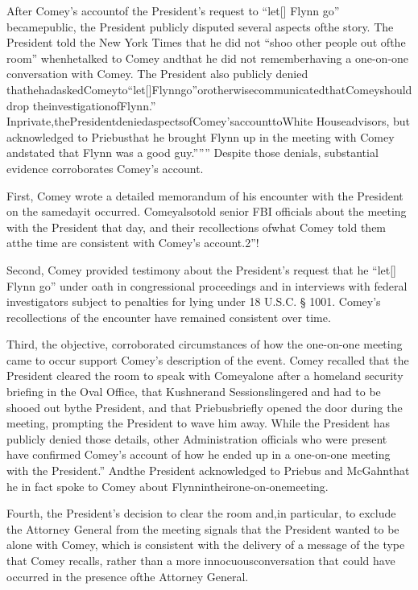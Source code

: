 After Comey’s accountof the President’s request to “let[] Flynn go” becamepublic, the President publicly disputed several aspects ofthe story.
The President told the New York Times that he did not “shoo other people out ofthe room” whenhetalked to Comey andthat he did not rememberhaving a one-on-one conversation with Comey.
The President also publicly denied thathehadaskedComeyto“let[]Flynngo”orotherwisecommunicatedthatComeyshoulddrop theinvestigationofFlynn.”
Inprivate,thePresidentdeniedaspectsofComey’saccounttoWhite Houseadvisors, but acknowledged to Priebusthat he brought Flynn up in the meeting with Comey andstated that Flynn was a good guy.”””
Despite those denials, substantial evidence corroborates Comey’s account.

First, Comey wrote a detailed memorandum of his encounter with the President on the samedayit occurred.
Comeyalsotold senior FBI officials about the meeting with the President that day, and their recollections ofwhat Comey told them atthe time are consistent with Comey’s account.2”!

Second, Comey provided testimony about the President’s request that he “let[] Flynn go” under oath in congressional proceedings and in interviews with federal investigators subject to penalties for lying under 18 U.S.C. § 1001.
Comey’s recollections of the encounter have remained consistent over time.

Third, the objective, corroborated circumstances of how the one-on-one meeting came to occur support Comey’s description of the event.
Comey recalled that the President cleared the room to speak with Comeyalone after a homeland security briefing in the Oval Office, that Kushnerand Sessionslingered and had to be shooed out bythe President, and that Priebusbriefly opened the door during the meeting, prompting the President to wave him away.
While the President has publicly denied those details, other Administration officials who were present have confirmed Comey’s account of how he ended up in a one-on-one meeting with the President.”
Andthe President acknowledged to Priebus and McGahnthat he in fact spoke to Comey about Flynnintheirone-on-onemeeting.

Fourth, the President’s decision to clear the room and,in particular, to exclude the Attorney General from the meeting signals that the President wanted to be alone with Comey, which is consistent with the delivery of a message of the type that Comey recalls, rather than a more innocuousconversation that could have occurred in the presence ofthe Attorney General.

